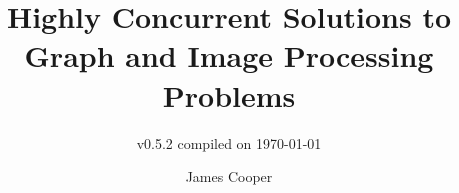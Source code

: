 \documentclass[newzealand,10pt,partial,draft,onehalfspace]{aucklandthesis}
\theoremstyle{plain}
\begin{document}
\frontmatter

%
%
%
\title{Highly Concurrent Solutions to Graph and Image Processing Problems}
\subtitle{{\small v0.5.2 compiled on \today}}
\author{James Cooper}

\maketitle
{}




\cleardoublepage\tableofcontents
\cleardoublepage\listoffixmes
\cleardoublepage\listoffigures
\cleardoublepage\listoftables
\cleardoublepage\listofcprulesetfloats
\cleardoublepage\listofcpobjectsfloats
\cleardoublepage\printglossary
\cleardoublepage\printglossary[type=\acronymtype]






%
%
%
%

\end{document}
